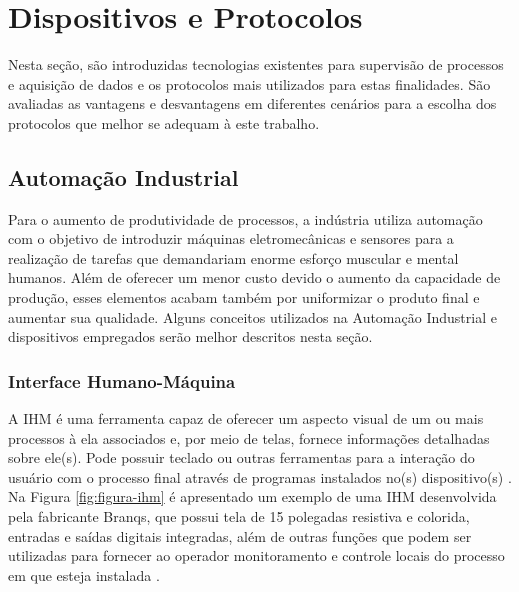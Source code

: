 \chapter{Dispositivos e Protocolos}
\label{chap:dispositivos-protocolos}

Nesta seção, são introduzidas tecnologias existentes para supervisão de processos e aquisição de dados e os protocolos mais utilizados para estas finalidades. São avaliadas as vantagens e desvantagens em diferentes cenários para a escolha dos protocolos que melhor se adequam à este trabalho.

    \section{Automação Industrial}        
    \label{sec:automacao-industrial}
    
    Para o aumento de produtividade de processos, a indústria utiliza automação com o objetivo de introduzir máquinas eletromecânicas e sensores para a realização de tarefas que demandariam enorme esforço muscular e mental humanos. Além de oferecer um menor custo devido o aumento da capacidade de produção, esses elementos acabam também por uniformizar o produto final e aumentar sua qualidade. Alguns conceitos utilizados na Automação Industrial e dispositivos empregados serão melhor descritos nesta seção.
    
    \subsection{Interface Humano-Máquina}
    \label{sec:ihm}

        A \gls{IHM} é uma ferramenta capaz de oferecer um aspecto visual de um ou mais processos à ela associados e, por meio de telas, fornece informações detalhadas sobre ele(s). Pode possuir teclado ou outras ferramentas para a interação do usuário com o processo final através de programas instalados no(s) dispositivo(s) \cite{mamede-instalacoes}. Na Figura \ref{fig:figura-ihm} é apresentado um exemplo de uma \gls{IHM} desenvolvida pela fabricante Branqs, que possui tela de 15 polegadas resistiva e colorida, entradas e saídas digitais integradas, além de outras funções que podem ser utilizadas para fornecer ao operador monitoramento e controle locais do processo em que esteja instalada \cite{Branqs}.
        
